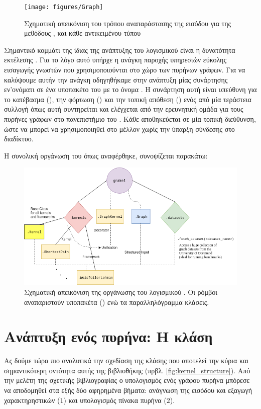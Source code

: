 \begin{figure}[]
    \centering
    \texttt{[image: figures/Graph]}
    \caption{Σχηματική απεικόνιση του τρόπου αναπαράστασης της εισόδου για της μεθόδους \texttt{}, \texttt{} και \texttt{} κάθε αντικειμένου τύπου }
    \label{fig:graph}
\end{figure}

Σημαντικό κομμάτι της ίδιας της ανάπτυξης του λογισμικού είναι η δυνατότητα εκτέλεσης .
Για το λόγο αυτό υπήρχε η ανάγκη παροχής υπηρεσιών εύκολης εισαγωγής γνωστών  που χρησιμοποιούνται στο χώρο των πυρήνων γράφων.
Για να καλύψουμε αυτήν την ανάγκη οδηγηθήκαμε στην ανάπτυξη μίας συνάρτησης εν'ονόματι  σε ένα υποπακέτο του  με το όνομα .
Η συνάρτηση αυτή είναι υπεύθυνη για το κατέβασμα (), την φόρτωση () και την τοπική απόθεση () ενός  από μία τεράστεια συλλογή όπως αυτή συντηρείται και ελέγχεται από την ερευνητική ομάδα για τους πυρήνες γράφων στο πανεπιστήμιο του  \cite{KKMMN2016}. Κάθε  αποθηκεύεται σε μία τοπική διεύθυνση, ώστε να μπορεί να χρησιμοποιηθεί στο μέλλον χωρίς την ύπαρξη σύνδεσης στο διαδίκτυο.

H συνολική οργάνωση του  όπως αναφέρθηκε, συνοψίζεται παρακάτω:
\begin{figure}[h]
    \centering
    \includegraphics[width=\textwidth]{figures/grakel-schema}
    \caption{Σχηματική απεικόνιση της οργάνωσης του λογισμικού . Οι ρόμβοι αναπαριστούν υποπακέτα () ενώ τα παραλληλόγραμμα κλάσεις.}
    \label{fig:grakel}
\end{figure}
\section{Ανάπτυξη ενός πυρήνα: Η κλάση }
Ας δούμε τώρα πιο αναλυτικά την σχεδίαση της κλάσης  που αποτελεί την κύρια και σημαντικότερη οντότητα αυτής της βιβλιοθήκης (πρβλ. \ref{fig:kernel_structure}).
Από την μελέτη της σχετικής βιβλιογραφίας ο υπολογισμός ενός γράφου πυρήνα μπόρεσε να αποδομηθεί στα εξής δύο αφηρημένα βήματα: ανάγνωση της εισόδου και εξαγωγή χαρακτηρηστικών ($1$) και υπολογισμός πίνακα πυρήνα ($2$).
